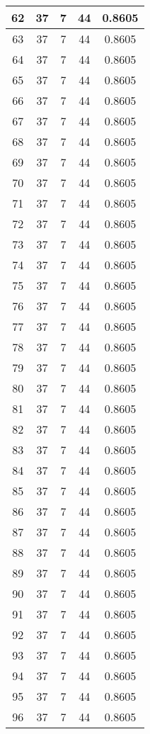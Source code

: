 \documentclass[letterpaper, 12pt]{article}
\begin{document}
\begin{longtable}{|c|c|c|c|c|}
\hline
62 & 37 & 7 & 44 & 0.8605 \\
\hline
63 & 37 & 7 & 44 & 0.8605 \\
\hline
64 & 37 & 7 & 44 & 0.8605 \\
\hline
65 & 37 & 7 & 44 & 0.8605 \\
\hline
66 & 37 & 7 & 44 & 0.8605 \\
\hline
67 & 37 & 7 & 44 & 0.8605 \\
\hline
68 & 37 & 7 & 44 & 0.8605 \\
\hline
69 & 37 & 7 & 44 & 0.8605 \\
\hline
70 & 37 & 7 & 44 & 0.8605 \\
\hline
71 & 37 & 7 & 44 & 0.8605 \\
\hline
72 & 37 & 7 & 44 & 0.8605 \\
\hline
73 & 37 & 7 & 44 & 0.8605 \\
\hline
74 & 37 & 7 & 44 & 0.8605 \\
\hline
75 & 37 & 7 & 44 & 0.8605 \\
\hline
76 & 37 & 7 & 44 & 0.8605 \\
\hline
77 & 37 & 7 & 44 & 0.8605 \\
\hline
78 & 37 & 7 & 44 & 0.8605 \\
\hline
79 & 37 & 7 & 44 & 0.8605 \\
\hline
80 & 37 & 7 & 44 & 0.8605 \\
\hline
81 & 37 & 7 & 44 & 0.8605 \\
\hline
82 & 37 & 7 & 44 & 0.8605 \\
\hline
83 & 37 & 7 & 44 & 0.8605 \\
\hline
84 & 37 & 7 & 44 & 0.8605 \\
\hline
85 & 37 & 7 & 44 & 0.8605 \\
\hline
86 & 37 & 7 & 44 & 0.8605 \\
\hline
87 & 37 & 7 & 44 & 0.8605 \\
\hline
88 & 37 & 7 & 44 & 0.8605 \\
\hline
89 & 37 & 7 & 44 & 0.8605 \\
\hline
90 & 37 & 7 & 44 & 0.8605 \\
\hline
91 & 37 & 7 & 44 & 0.8605 \\
\hline
92 & 37 & 7 & 44 & 0.8605 \\
\hline
93 & 37 & 7 & 44 & 0.8605 \\
\hline
94 & 37 & 7 & 44 & 0.8605 \\
\hline
95 & 37 & 7 & 44 & 0.8605 \\
\hline
96 & 37 & 7 & 44 & 0.8605 \\

\end{longtable}
\end{document}
